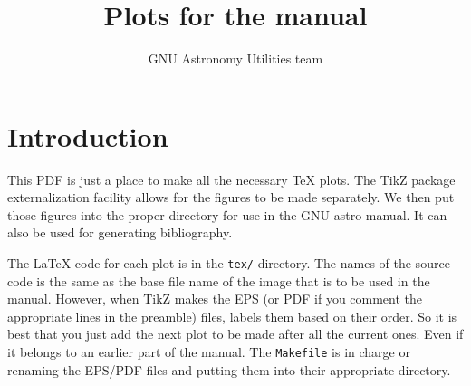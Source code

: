 \documentclass[a4paper]{article}
\author{GNU Astronomy Utilities team}
\title{Plots for the manual}
\begin{document}
\maketitle

\section{Introduction}\label{intro}

This PDF is just a place to make all the necessary \TeX{} plots. The
TikZ package externalization facility allows for the figures to be
made separately. We then put those figures into the proper directory
for use in the GNU astro manual. It can also be used for generating
bibliography.

The \LaTeX{} code for each plot is in the \texttt{tex/} directory. The
names of the source code is the same as the base file name of the
image that is to be used in the manual. However, when TikZ makes the
EPS (or PDF if you comment the appropriate lines in the preamble)
files, labels them based on their order. So it is best that you just
add the next plot to be made after all the current ones. Even if it
belongs to an earlier part of the manual. The \texttt{Makefile} is in
charge or renaming the EPS/PDF files and putting them into their
appropriate directory.










\end{document}
